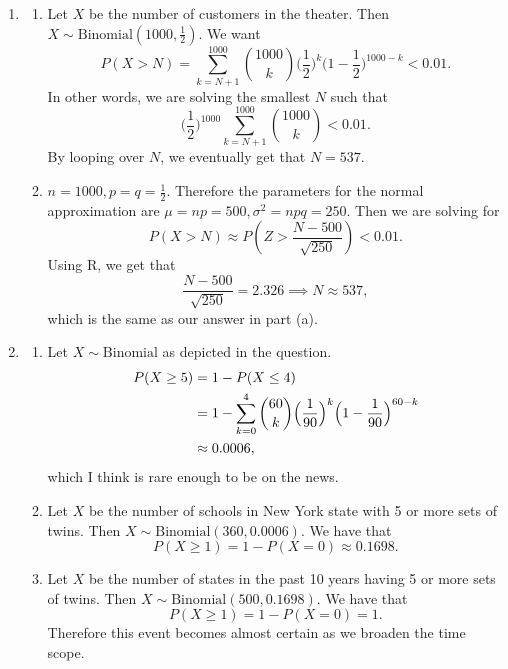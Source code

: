 \documentclass{article}
\begin{document}
\begin{enumerate}
    \item \begin{enumerate}
        \item Let $X$ be the number of customers in the theater. Then 
        $X \sim \text{Binomial}(1000, \frac{1}{2}).$ We want 
        \[ P(X > N) = \sum_{k = N + 1}^{1000} \binom{1000}{k} \Big( \frac{1}{2} \Big)^{k} 
        \Big( 1 - \frac{1}{2} \Big)^{1000 - k} < 0.01.\]
        In other words, we are solving the smallest $N$ such that 
        \[ \Big( \frac{1}{2} \Big)^{1000} \sum_{k = N + 1}^{1000} \binom{1000}{k} < 0.01. \]
        By looping over $N$, we eventually get that $N = 537$.

        \item $n = 1000, p = q = \frac{1}{2}$. Therefore the parameters for the normal 
        approximation are $\mu = np = 500, \sigma^2 = npq = 250$. Then we are solving for 
        \[ P(X > N) \approx P(Z > \frac{N - 500}{\sqrt{250}}) < 0.01. \]
        Using R, we get that 
        \[ \frac{N - 500}{\sqrt{250}} = 2.326 \implies N \approx 537, \]
        which is the same as our answer in part (a).
    \end{enumerate} 

    \item \begin{enumerate}
        \item Let $X \sim \text{Binomial}$ as depicted in the question. 
        \begin{align*}
            P(X \geq 5)
            &= 1 - P(X \leq 4) \\
            &= 1 - \sum_{k = 0}^{4} \binom{60}{k} \Big( \frac{1}{90} \Big)^{k} 
            \Bigl( 1 - \frac{1}{90} \Bigr)^{60 - k} \\
            &\approx 0.0006,
        \end{align*}
        which I think is rare enough to be on the news.

        \item Let $X$ be the number of schools in New York state with 5 or more sets of twins. Then 
        $X \sim \text{Binomial}(360, 0.0006)$. We have that 
        \[ P(X \geq 1) = 1 - P(X = 0) \approx 0.1698. \]

        \item Let $X$ be the number of states in the past 10 years having 5 or more sets of twins. Then 
        $X \sim \text{Binomial}(500, 0.1698)$. We have that 
        \[ P(X \geq 1) = 1 - P(X = 0) = 1. \]
        Therefore this event becomes almost certain as we broaden the time scope.
    \end{enumerate}

\end{enumerate}
\end{document}
